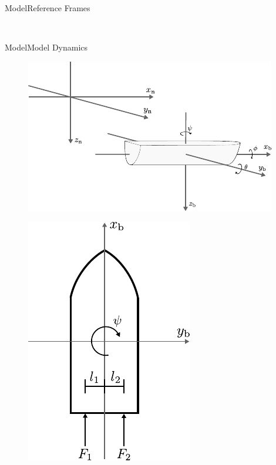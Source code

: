 \begin{frame}{Model}{Reference Frames}
\begin{minipage}{0.3\linewidth}
\begin{figure}[H]
        \end{figure}                
    \end{minipage}\hfill \\
\end{frame}

\begin{frame}{Model}{Model Dynamics}
    \begin{minipage}{0.65\linewidth}
        \begin{figure}[H]
            \centering
            \includegraphics[width=1\linewidth]{figures/boat3D}
        \end{figure}        
    \end{minipage}\hfill      
    \begin{minipage}{0.3\linewidth}
        \begin{figure}[H]
            \centering
            \includegraphics[width=0.7\linewidth]{figures/boat2D}

\end{figure}
\end{minipage}
\end{frame}
